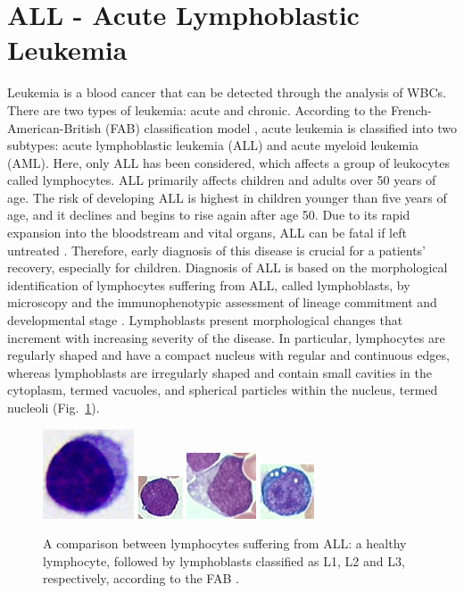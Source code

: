 \documentclass[final,a4paper,12pt,english]{UnicaPhdThesis3}
\begin{document}
\section{ALL - Acute Lymphoblastic Leukemia}
Leukemia is a blood cancer that can be detected through the analysis of WBCs. There are two types of leukemia: acute and chronic. According to the French-American-British (FAB) classification model \cite{Bennett}, acute leukemia is classified into two subtypes: acute lymphoblastic leukemia (\acs{ALL}) and acute myeloid leukemia (AML). Here, only ALL has been considered, which affects a group of leukocytes called lymphocytes. ALL primarily affects children and adults over 50 years of age. The risk of developing ALL is highest in children younger than five years of age, and it declines and begins to rise again after age 50. Due to its rapid expansion into the bloodstream and vital organs, ALL can be fatal if left untreated \cite{Biondi}. Therefore, early diagnosis of this disease is crucial for a patients' recovery, especially for children. Diagnosis of ALL is based on the morphological identification of lymphocytes suffering from ALL, called lymphoblasts, by microscopy and the immunophenotypic assessment of lineage commitment and developmental stage \cite{Inaba}. Lymphoblasts present morphological changes that increment with increasing severity of the disease. In particular, lymphocytes are regularly shaped and have a compact nucleus with regular and continuous edges, whereas lymphoblasts are irregularly shaped and contain small cavities in the cytoplasm, termed vacuoles, and spherical particles within the nucleus, termed nucleoli \cite{Donida} (Fig.~\ref{fig:ex2}).

\begin{figure}[!t]
	\centering
	\includegraphics[height=0.125\textheight]{images/crop-BlastNo}
	\includegraphics[height=0.125\textheight]{images/crop-BlastL1}
	\includegraphics[height=0.125\textheight]{images/crop-BlastL2}
	\includegraphics[height=0.125\textheight]{images/crop-BlastL3}
	\caption{\label{fig:ex2}A comparison between lymphocytes suffering from ALL: a healthy lymphocyte, followed by lymphoblasts classified as L1, L2 and L3, respectively, according to the FAB \cite{Bennett}.}
\end{figure}
\end{document}
